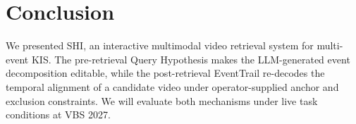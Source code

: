 \section{Conclusion}
\label{sec:conclusion}

We presented SHI, an interactive multimodal video retrieval system for
multi-event KIS. The pre-retrieval Query Hypothesis makes the LLM-generated
event decomposition editable, while the post-retrieval EventTrail re-decodes the
temporal alignment of a candidate video under operator-supplied anchor and
exclusion constraints. We will evaluate both mechanisms under live task
conditions at VBS 2027.

